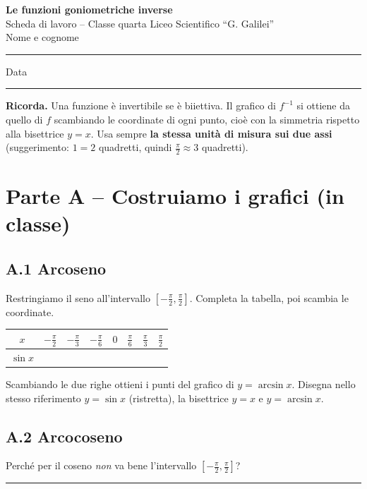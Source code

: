 \documentclass[11pt,a4paper]{article}
\newcommand{\vuoto}{\hspace{1.4cm}}
\begin{document}
\begin{center}
{\Large\bfseries Le funzioni goniometriche inverse}\\[3pt]
Scheda di lavoro -- Classe quarta \qquad Liceo Scientifico ``G. Galilei''\\[6pt]
Nome e cognome \rule{6cm}{0.4pt} \qquad Data \rule{3cm}{0.4pt}
\end{center}

\noindent\textbf{Ricorda.} Una funzione \`e invertibile se \`e biiettiva. Il grafico di $f^{-1}$ si ottiene da quello di $f$ scambiando le coordinate di ogni punto, cio\`e con la simmetria rispetto alla bisettrice $y=x$. Usa sempre \textbf{la stessa unit\`a di misura sui due assi} (suggerimento: $1=2$ quadretti, quindi $\tfrac{\pi}{2}\approx 3$ quadretti).

\section*{Parte A -- Costruiamo i grafici (in classe)}

\subsection*{A.1 Arcoseno}
Restringiamo il seno all'intervallo $\left[-\tfrac{\pi}{2},\tfrac{\pi}{2}\right]$. Completa la tabella, poi scambia le coordinate.

\begin{center}
\renewcommand{\arraystretch}{1.5}
\begin{tabular}{|c|*{7}{c|}}
\hline
$x$ & $-\frac{\pi}{2}$ & $-\frac{\pi}{3}$ & $-\frac{\pi}{6}$ & $0$ & $\frac{\pi}{6}$ & $\frac{\pi}{3}$ & $\frac{\pi}{2}$\\\hline
$\sin x$ & \vuoto&\vuoto&\vuoto&\vuoto&\vuoto&\vuoto&\vuoto\\\hline
\end{tabular}
\end{center}
Scambiando le due righe ottieni i punti del grafico di $y=\arcsin x$. Disegna nello stesso riferimento $y=\sin x$ (ristretta), la bisettrice $y=x$ e $y=\arcsin x$.

\subsection*{A.2 Arcocoseno}
Perch\'e per il coseno \emph{non} va bene l'intervallo $\left[-\tfrac{\pi}{2},\tfrac{\pi}{2}\right]$?\\[2pt] \rule{\textwidth}{0.4pt}
\end{document}
